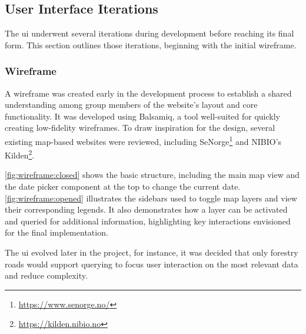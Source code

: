 \subsection{User Interface Iterations} %

The \acrfull{ui} underwent several iterations during development before reaching its final form. This section outlines those iterations, beginning with the initial wireframe.

\subsubsection*{Wireframe}

A wireframe was created early in the development process to establish a shared understanding among group members of the website's layout and core functionality. It was developed using Balsamiq, a tool well-suited for quickly creating low-fidelity wireframes. To draw inspiration for the design, several existing map-based websites were reviewed, including SeNorge\footnote{\url{https://www.senorge.no/}} and NIBIO's Kilden\footnote{\url{https://kilden.nibio.no}}.

\autoref{fig:wireframe:closed} shows the basic structure, including the main map view and the date picker component at the top to change the current date. \autoref{fig:wireframe:opened} illustrates the sidebars used to toggle map layers and view their corresponding legends. It also demonstrates how a layer can be activated and queried for additional information, highlighting key interactions envisioned for the final implementation.

The \acrshort{ui} evolved later in the project, for instance, it was decided that only forestry roads would support querying to focus user interaction on the most relevant data and reduce complexity.

